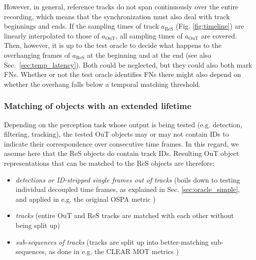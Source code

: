 \documentclass[conference]{IEEEtran}
\begin{document}
However, in general, reference tracks do not span continuously over the entire recording, which means that the synchronization must also deal with track beginnings and ends. %
If the sampling times of track $a_\text{ReS}$ (Fig. \ref{fig:timeline}) are linearly interpolated to those of $a_\text{OuT}$, all sampling times of $a_\text{OuT}$ are covered. 
Then, however, it is up to the test oracle to decide what happens to the overhanging frames of $a_\text{ReS}$ at the beginning and at the end (see also Sec.~\ref{sec:temp_latency}). 
Both could be neglected, but they could also both mark FNs. 
Whether or not the test oracle identifies FNs there might also depend on whether the overhang falls below a temporal matching threshold. %



\subsubsection{Matching of objects with an extended lifetime}
\label{sec:temp_matching}

Depending on the perception task whose output is being tested (e.g. detection, filtering, tracking), the tested OuT objects may or may not contain IDs to indicate their correspondence over consecutive time frames. 
In this regard, we assume here that the ReS objects do contain track IDs. 
Resulting OuT object representations that can be matched to the ReS objects are therefore:
\begin{itemize}
\item \textit{detections or ID-stripped single frames out of tracks} (boils down to testing individual decoupled time frames, as explained in Sec. \ref{sec:oracle_simple}, and applied in e.g. the original OSPA metric \cite{schuhmacher2008consistent}) %
\item \textit{tracks} (entire OuT and ReS tracks are matched with each other without being split up)
\item \textit{sub-sequences of tracks} (tracks are split up into better-matching sub-sequences, as done in e.g. the CLEAR MOT metrics \cite{bernardin2008evaluating})
\end{itemize}
\end{document}
